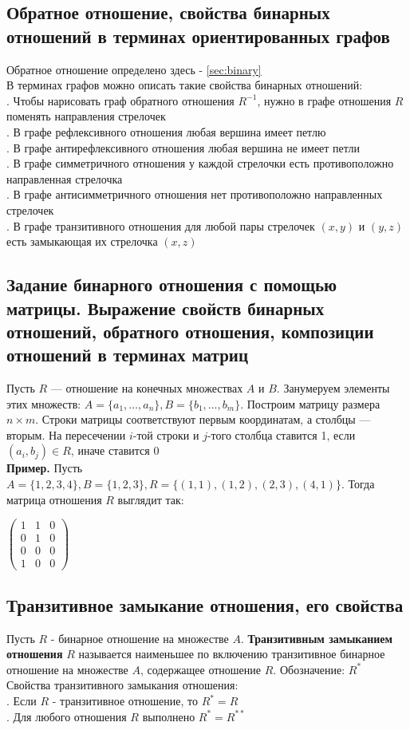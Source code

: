 \documentclass[a4paper]{article}
\begin{document}
\subsection{Обратное отношение, свойства бинарных отношений в терминах ориентированных графов}
Обратное отношение определено здесь - \ref{sec:binary}\\[2mm]
В терминах графов можно описать такие свойства бинарных отношений:\\[2mm]
. Чтобы нарисовать граф обратного отношения $R^{-1}$, нужно в графе отношения $R$ поменять направления стрелочек\\[2mm]
. В графе рефлексивного отношения любая вершина имеет петлю\\[2mm]
. В графе антирефлексивного отношения любая вершина не имеет петли\\[2mm]
. В графе симметричного отношения у каждой стрелочки есть противоположно направленная стрелочка\\[2mm]
. В графе антисимметричного отношения нет противоположно направленных стрелочек\\[2mm]
. В графе транзитивного отношения для любой пары стрелочек $(x,y)$ и $(y,z)$ есть замыкающая их стрелочка $(x, z)$
\subsection{Задание бинарного отношения с помощью матрицы. Выражение свойств бинарных отношений, обратного отношения, композиции отношений в терминах матриц}
Пусть $R$ — отношение на конечных множествах $A$ и $B$. Занумеруем элементы этих множеств: $A=\{a_1,\ldots,a_n\}, B=\{b_1,\ldots,b_m\}$. Построим матрицу размера $n\times m$. Строки матрицы соответствуют первым координатам, а столбцы — вторым. На пересечении $i$-той строки и $j$-того столбца ставится 1, если $(a_i, b_j)\in R$, иначе ставится 0\\[2mm]
\textbf{Пример.} Пусть $A=\{1,2,3,4\}, B=\{1, 2, 3\}, R=\{(1,1), (1, 2), (2, 3), (4,1)\}$. Тогда матрица отношения $R$ выглядит так:\\[2mm]
\centerline{$\begin{pmatrix}
    1&1&0\\
    0&1&0\\
    0&0&0\\
    1&0&0
\end{pmatrix}$}
\subsection{Транзитивное замыкание отношения, его свойства}
Пусть $R$ - бинарное отношение на множестве $A$. \textbf{Транзитивным замыканием отношения} $R$ называется наименьшее по включению транзитивное бинарное отношение на множестве $A$, содержащее отношение $R$. Обозначение: $R^*$\\[2mm]
\label{sec:1.62}Свойства транзитивного замыкания отношения:\\[2mm]
. Если $R$ - транзитивное отношение, то $R^*=R$\\[2mm]
. Для любого отношения $R$ выполнено $R^*=R^{**}$
\end{document}
